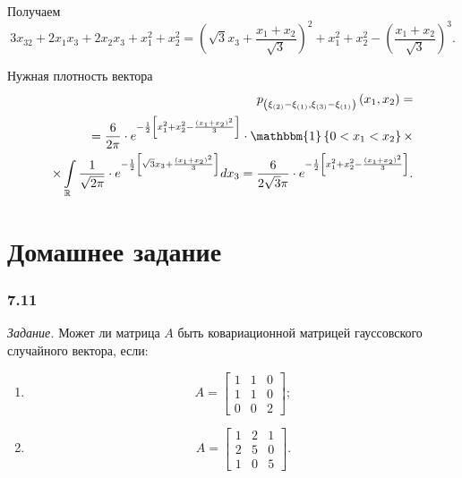 \begin{enumerate}[label=\alph*)]
  Получаем
  $$3x_32 + 2x_1 x_3 + 2x_2 x_3 + x_1^2 + x_2^2 =
    \left( \sqrt{3} x_3 + \frac{x_1 + x_2}{ \sqrt{3}} \right)^2 + x_1^2 + x_2^2 -
    \left( \frac{x_1 + x_2}{ \sqrt{3}} \right)^3.$$

  Нужная плотность вектора
  \begin{equation*}
    \begin{split}
      p_{ \left( \xi_{ \left( 2 \right) } - \xi_{ \left( 1 \right) }, \xi_{ \left( 3 \right) } - \xi_{ \left( 1 \right) } \right) }
      \left( x_1, x_2 \right) = \\
      = \frac{6}{2 \pi } \cdot
      e^{- \frac{1}{2} \left[ x_1^2 + x_2^2 - \frac{ \left( x_1 + x_2 \right)^2}{3} \right] } \cdot
      \mathbbm{1} \left\{ 0 < x_1 < x_2 \right\} \times \\
      \times \int \limits_{ \mathbb{R}}
        \frac{1}{ \sqrt{2 \pi }} \cdot
        e^{- \frac{1}{2} \left[ \sqrt{3} x_3 + \frac{ \left( x_1 + x_2 \right)^2}{3} \right]}
      dx_3 =
      \frac{6}{2 \sqrt{3} \pi } \cdot
      e^{- \frac{1}{2} \left[ x_1^2 + x_2^2 - \frac{ \left( x_1 + x_2 \right)^2}{3} \right] }.
    \end{split}
  \end{equation*}
\end{enumerate}

\section*{Домашнее задание}

\subsubsection*{7.11}

\textit{Задание.}
Может ли матрица $A$ быть ковариационной матрицей гауссовского случайного вектора, если:
\begin{enumerate}[label=\alph*)]
  \item $$A =
    \begin{bmatrix}
      1 & 1 & 0 \\
      1 & 1 & 0 \\
      0 & 0 & 2
    \end{bmatrix};$$
  \item $$A =
    \begin{bmatrix}
      1 & 2 & 1 \\
      2 & 5 & 0 \\
      1 & 0 & 5
    \end{bmatrix}.$$
\end{enumerate}

